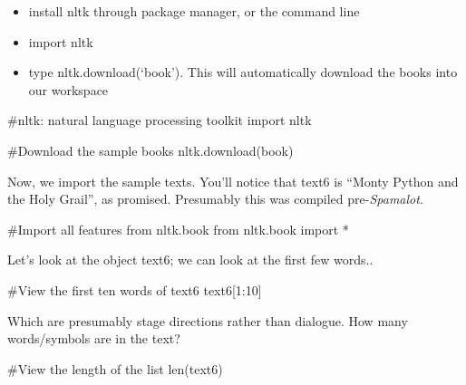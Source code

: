 \documentclass[
  letterpaper,
  DIV=11,
  numbers=noendperiod]{scrreprt}
\newenvironment{Shaded}{\begin{snugshade}}{\end{snugshade}}
\newcommand{\BuiltInTok}[1]{\textcolor[rgb]{0.00,0.23,0.31}{#1}}
\newcommand{\CommentTok}[1]{\textcolor[rgb]{0.37,0.37,0.37}{#1}}
\newcommand{\DecValTok}[1]{\textcolor[rgb]{0.68,0.00,0.00}{#1}}
\newcommand{\ImportTok}[1]{\textcolor[rgb]{0.00,0.46,0.62}{#1}}
\newcommand{\NormalTok}[1]{\textcolor[rgb]{0.00,0.23,0.31}{#1}}
\newcommand{\OperatorTok}[1]{\textcolor[rgb]{0.37,0.37,0.37}{#1}}
\newcommand{\StringTok}[1]{\textcolor[rgb]{0.13,0.47,0.30}{#1}}
\providecommand{\tightlist}{%
  \setlength{\itemsep}{0pt}\setlength{\parskip}{0pt}}\usepackage{longtable,booktabs,array}
\begin{document}
\begin{itemize}
\tightlist
\item
  install nltk through package manager, or the command line
\item
  import nltk
\item
  type nltk.download(`book'). This will automatically download the books
  into our workspace
\end{itemize}

\begin{Shaded}
\begin{Highlighting}[]
\CommentTok{\#nltk: natural language processing toolkit}
\ImportTok{import}\NormalTok{ nltk}
\end{Highlighting}
\end{Shaded}

\begin{Shaded}
\begin{Highlighting}[]
\CommentTok{\#Download the sample books}
\NormalTok{nltk.download(}\StringTok{\textquotesingle{}book\textquotesingle{}}\NormalTok{)}
\end{Highlighting}
\end{Shaded}

Now, we import the sample texts. You'll notice that text6 is ``Monty
Python and the Holy Grail'', as promised. Presumably this was compiled
pre-\emph{Spamalot}.

\begin{Shaded}
\begin{Highlighting}[]
\CommentTok{\#Import all features from nltk.book}
\ImportTok{from}\NormalTok{ nltk.book }\ImportTok{import} \OperatorTok{*}
\end{Highlighting}
\end{Shaded}

Let's look at the object text6; we can look at the first few words..

\begin{Shaded}
\begin{Highlighting}[]
\CommentTok{\#View the first ten words of text6}
\NormalTok{text6[}\DecValTok{1}\NormalTok{:}\DecValTok{10}\NormalTok{]}
\end{Highlighting}
\end{Shaded}

Which are presumably stage directions rather than dialogue. How many
words/symbols are in the text?

\begin{Shaded}
\begin{Highlighting}[]
\CommentTok{\#View the length of the list}
\BuiltInTok{len}\NormalTok{(text6)}
\end{Highlighting}
\end{Shaded}
\end{document}
